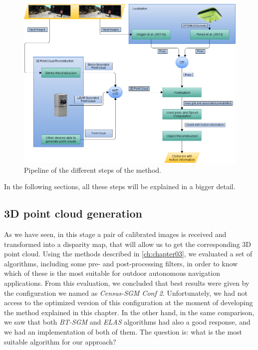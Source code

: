 \begin{figure}[t]
  \centering
  \includegraphics[height=\textwidth, width=\textwidth]{pipeline_general}
  \caption{Pipeline of the different steps of the method.}
  \label{fig:cp05_pipeline_general}
\end{figure}

In the following sections, all these steps will be explained in a bigger detail.

\subsection{3D point cloud generation}\label{ch:chapter05_01_01}

As we have seen, in this stage a pair of calibrated images is received and transformed into a disparity map, that will allow us to get the corresponding 3D point cloud. Using the methods described in \ref{ch:chapter03}, we evaluated a set of algorithms, including some pre- and post-processing filters, in order to know which of these is the most suitable for outdoor autonomous navigation applications. From this evaluation, we concluded that best results were given by the configuration we named as \emph{Census-SGM Conf 2}. Unfortunately, we had not access to the optimized version of this configuration at the moment of developing the method explained in this chapter. In the other hand, in the same comparison, we saw that both \emph{BT-SGM} and \emph{ELAS} algorithms had also a good response, and we had an implementation of both of them. The question is: what is the most suitable algorithm for our approach? 

